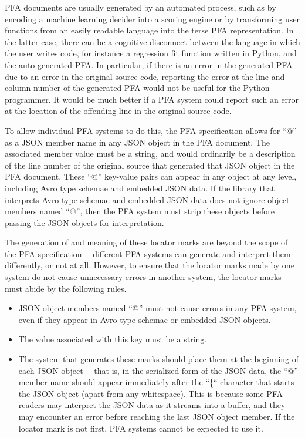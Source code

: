 \documentclass{article}
\theoremstyle{definition}
\begin{document}
PFA documents are usually generated by an automated process, such as by encoding a machine learning decider into a scoring engine or by transforming user functions from an easily readable language into the terse PFA representation.  In the latter case, there can be a cognitive disconnect between the language in which the user writes code, for instance a regression fit function written in Python, and the auto-generated PFA.  In particular, if there is an error in the generated PFA due to an error in the original source code, reporting the error at the line and column number of the generated PFA would not be useful for the Python programmer.  It would be much better if a PFA system could report such an error at the location of the offending line in the original source code.

To allow individual PFA systems to do this, the PFA specification allows for ``@'' as a JSON member name in any JSON object in the PFA document.  The associated member value must be a string, and would ordinarily be a description of the line number of the original source that generated that JSON object in the PFA document.  These ``@'' key-value pairs can appear in any object at any level, including Avro type schemae and embedded JSON data.  If the library that interprets Avro type schemae and embedded JSON data does not ignore object members named ``@'', then the PFA system must strip these objects before passing the JSON objects for interpretation.

The generation of and meaning of these locator marks are beyond the scope of the PFA specification--- different PFA systems can generate and interpret them differently, or not at all.  However, to ensure that the locator marks made by one system do not cause unnecessary errors in another system, the locator marks must abide by the following rules.
\begin{itemize}
\item JSON object members named ``@'' must not cause errors in any PFA system, even if they appear in Avro type schemae or embedded JSON objects.
\item The value associated with this key must be a string.
\item The system that generates these marks should place them at the beginning of each JSON object--- that is, in the serialized form of the JSON data, the ``@'' member name should appear immediately after the ``\{`` character that starts the JSON object (apart from any whitespace).  This is because some PFA readers may interpret the JSON data as it streams into a buffer, and they may encounter an error before reaching the last JSON object member.  If the locator mark is not first, PFA systems cannot be expected to use it.
\end{itemize}
\end{document}
